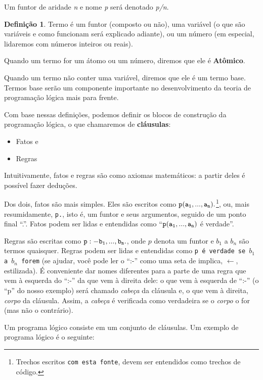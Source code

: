 \documentclass{article}
\theoremstyle{definition}
\newtheorem{definition}{Definição}[section]
\theoremstyle{remark}
\begin{document}
    Um funtor de aridade \textit{n} e nome \textit{p} será denotado \textit{p/n}.



  \theoremstyle{definition}
  \begin{definition}{Termo}
     é um funtor (composto ou não), uma variável (o que são variáveis e como funcionam será explicado adiante), ou um número (em especial, lidaremos com números inteiros ou reais).
  \end{definition}

  Quando um termo for um átomo ou um número, diremos que ele é \textbf{Atômico}.

Quando um termo não conter uma variável, diremos que ele é um termo base.
Termos base serão um componente importante no desenvolvimento da teoria de programação lógica mais para frente.

Com base nessas definições, podemos definir os blocos de construção da programação lógica, o que chamaremos de \textbf{cláusulas}:
\begin{itemize}
  \item Fatos e
  \item Regras
\end{itemize}

Intuitivamente, fatos e regras são como axiomas matemáticos: a partir deles é possível fazer deduções.

Dos dois, fatos são mais simples. Eles são escritos como  ${\tt p(a_1, ..., a_n).}$\footnote{Trechos escritos {\tt com esta fonte}, devem ser entendidos como trechos de código.},  ou, mais resumidamente, {\tt p.}, isto é, um funtor e seus argumentos, seguido de um ponto final ``.''. Fatos podem ser lidas e entendidas como ``${\tt p(a_1, ..., a_n)}$ é verdade''.

Regras são escritas como ${\tt p :- b_1, ..., b_n.}$, onde $p$ denota um funtor e $b_1$ a $b_n$ são termos quaisquer. Regras podem ser lidas e entendidas como {\tt p é verdade se $b_1$ a $b_n$ forem} (se ajudar, você pode ler o ``:-'' como uma seta de implica, $\leftarrow$, estilizada). É conveniente dar nomes diferentes para a parte de uma regra que vem à esquerda do ``:-'' da que vem à direita dele: o que vem à esquerda de ``:-'' (o ``p'' do nosso exemplo) será chamado \textit{cabeça} da cláusula e, o que vem à direita, \textit{corpo} da cláusula. Assim, a
\textit{cabeça} é verificada como verdadeira se o \textit{corpo} o for (mas não o contrário).

Um programa lógico consiste em um conjunto de cláusulas. Um exemplo de programa lógico é o seguinte:\\
\end{document}
